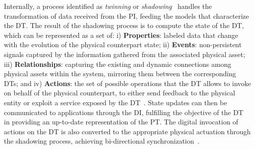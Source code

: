 Internally, a process identified as \emph{twinning} or \emph{shadowing}~\cite{saracco2019dt,web-of-dt-ricci-2022} handles the transformation of data received from the PI, feeding the models that characterize the \ac{DT}. The result of the shadowing process is to compute the state of the \ac{DT}, which can be represented as a set of: i) \textbf{Properties}: labeled data that change with the evolution of the physical counterpart state; ii) \textbf{Events}: non-persistent signals captured by the information gathered from the associated physical asset; iii) \textbf{Relationships}: capturing the existing and dynamic connections among physical assets within the system, mirroring them between the corresponding \acp{DT}; and iv) \textbf{Actions}: the set of possible operations that the \ac{DT} allows to invoke on behalf of the physical counterpart, to either send feedback to the physical entity or exploit a service exposed by the \ac{DT}~\cite{web-of-dt-ricci-2022}.
%
State updates can then be communicated to applications through the \ac{DI}, fulfilling the objective of the \ac{DT} in providing an up-to-date representation of the \ac{PT}.
%
The digital invocation of actions on the \ac{DT} is also converted to the appropriate physical actuation through the shadowing process, achieving bi-directional synchronization~\cite{web-of-dt-ricci-2022}.

